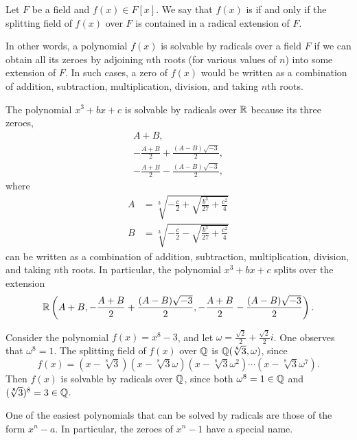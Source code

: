 \begin{definition}
    Let $F$ be a field and $f(x) \in F[x]$. We say that $f(x)$ is  if and only if the splitting field of $f(x)$ over $F$ is contained in a radical extension of $F$.
\end{definition}

In other words, a polynomial $f(x)$ is solvable by radicals over a field $F$ if we can obtain all its zeroes by adjoining $n$th roots (for various values of $n$) into some extension of $F$. In such cases, a zero of $f(x)$ would be written as a combination of addition, subtraction, multiplication, division, and taking $n$th roots.

\begin{example}\label{example-depressed-cubic-formula}
    The polynomial $x^3 + bx + c$ is solvable by radicals over $\mathbb{R}$ because its three zeroes,
    \begin{gather*}
        A+B,\\
        -\frac{A+B}2 + \frac{(A-B)\sqrt{-3}}{2},\\
        -\frac{A+B}2 - \frac{(A-B)\sqrt{-3}}{2},
    \end{gather*}
    where
    \begin{align*}
        A &= \sqrt[3]{-\frac c2 + \sqrt{\frac{b^3}{27} + \frac{c^2}4}}\\
        B &= \sqrt[3]{-\frac c2 - \sqrt{\frac{b^3}{27} + \frac{c^2}4}}
    \end{align*}
    can be written as a combination of addition, subtraction, multiplication, division, and taking $n$th roots. In particular, the polynomial $x^3 + bx + c$ splits over the extension
    \[
        \mathbb{R}\left(A+B, -\frac{A+B}2 + \frac{(A-B)\sqrt{-3}}{2}, -\frac{A+B}2 - \frac{(A-B)\sqrt{-3}}{2}\right).
    \]
\end{example}

\begin{example}
    Consider the polynomial $f(x) = x^8 - 3$, and let $\omega = \frac{\sqrt2}{2} + \frac{\sqrt2}{2}i$. One observes that $\omega^8 = 1$. The splitting field of $f(x)$ over $\mathbb{Q}$ is $\mathbb{Q}(\sqrt[8]3, \omega)$, since
    \[
        f(x) = (x-\sqrt[8]3)(x-\sqrt[8]3\omega)(x-\sqrt[8]3\omega^2)\cdots(x-\sqrt[8]3\omega^7).
    \]
    Then $f(x)$ is solvable by radicals over $\mathbb{Q}$, since both $\omega^8 = 1 \in \mathbb{Q}$ and $(\sqrt[8]3)^8 = 3 \in \mathbb{Q}$.
\end{example}

One of the easiest polynomials that can be solved by radicals are those of the form $x^n - a$. In particular, the zeroes of $x^n - 1$ have a special name.

